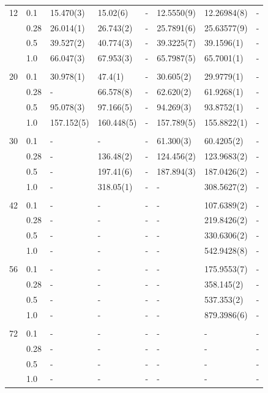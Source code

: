 \begin{table} [H]
\begin{tabularx}{\textwidth}{l:l|XXXXXX}
		12 & 0.1 & 15.470(3) & 15.02(6) & - & 12.5550(9) & 12.26984(8) & -\\ 
		& 0.28 & 26.014(1) & 26.743(2) & - & 25.7891(6) & 25.63577(9) & -\\
		& 0.5 & 39.527(2) & 40.774(3) & - & 39.3225(7) & 39.1596(1) & - \\
		& 1.0 & 66.047(3) & 67.953(3) & - & 65.7987(5) & 65.7001(1) & - \\ \hdashline \\
		
		20 & 0.1 & 30.978(1) & 47.4(1) & - & 30.605(2) & 29.9779(1) & - \\ 
		& 0.28 & - & 66.578(8) & - & 62.620(2) & 61.9268(1) & - \\
		& 0.5 & 95.078(3) & 97.166(5) & - & 94.269(3) & 93.8752(1) & - \\
		& 1.0 & 157.152(5) & 160.448(5) & - & 157.789(5) & 155.8822(1) & - \\ \hdashline \\
		
		30 & 0.1 & - & - & - & 61.300(3) & 60.4205(2) & -\\ 
		& 0.28 & - & 136.48(2) & - & 124.456(2) & 123.9683(2) & - \\
		& 0.5 & - & 197.41(6) & - & 187.894(3) & 187.0426(2) & -\\
		& 1.0 & - & 318.05(1) & - & - & 308.5627(2) & -\\
		\hdashline \\
		
		42 & 0.1 & - & - & - & - & 107.6389(2) & -\\ 
		& 0.28 & - & - & - & - & 219.8426(2) & - \\
		& 0.5 & - & - & - & - & 330.6306(2) & -\\
		& 1.0 & - & - & - & - & 542.9428(8) & -\\
		\hdashline \\
		
		56 & 0.1 & - & - & - & - & 175.9553(7) & -\\ 
		& 0.28 & - & - & - & - & 358.145(2) & - \\
		& 0.5 & - & - & - & - & 537.353(2) & -\\
		& 1.0 & - & - & - & - & 879.3986(6) & -\\
		\hdashline \\
		
		72 & 0.1 & - & - & - & - & - & -\\ 
		& 0.28 & - & - & - & - & - & - \\
		& 0.5 & - & - & - & - & - & -\\
		& 1.0 & - & - & - & - & - & -\\ \hline\hline
	\end{tabularx}
\end{table}

